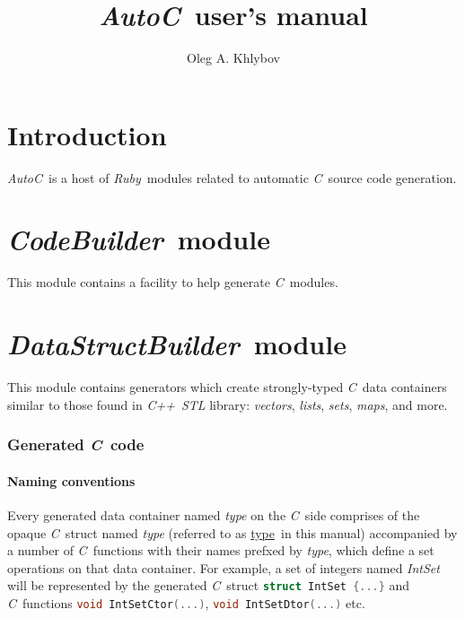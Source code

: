 \documentclass[a4paper]{article}
\newcommand{\autoc}{\emph{AutoC}}
\newcommand{\R}{\emph{Ruby}}
\newcommand{\C}{\emph{C}}
\newcommand{\Cpp}{\emph{C++}}
\newcommand{\type}{\underline{type}}
\begin{document}
\title{\autoc\ user's manual}
\author{Oleg A. Khlybov}


\maketitle


\part{Introduction}


\autoc\ is a host of \R\ modules related to automatic \C\ source code generation.


\newcommand{\codebuilder}{\emph{CodeBuilder}}
\part{\codebuilder\ module}


This module contains a facility to help generate \C\ modules.


\newcommand{\datastructbuilder}{\emph{DataStructBuilder}}
\part{\datastructbuilder\ module}


This module contains generators which create strongly-typed \C\ data containers similar to those found in \Cpp\ \emph{STL} library: \emph{vectors}, \emph{lists}, \emph{sets}, \emph{maps}, and more.


\section{Generated \C\ code}


\subsection{Naming conventions}


Every generated data container named \emph{type} on the \C\ side comprises of the opaque \C\ struct named \emph{type} (referred to as \type\ in this manual) accompanied by a number of \C\ functions with their names prefxed by \emph{type}, which define a set operations on that data container.
For example, a set of integers named \emph{IntSet} will be represented by the generated \C\ struct \lstinline[language=C]!struct IntSet {...}! and \C\ functions \lstinline[language=C]!void IntSetCtor(...)!, \lstinline[language=C]!void IntSetDtor(...)! etc.
\end{document}
